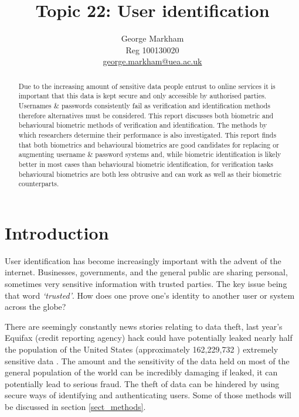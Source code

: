 \documentclass[12pt]{article}
\title{Topic 22: User identification}
\author{George Markham\\Reg 100130020\\\small
\href{mailto:george.markham@uea.ac.uk}{george.markham@uea.ac.uk}}
\begin{document}
	\maketitle
	
    
	\begin{abstract}
	Due to the increasing amount of sensitive data people entrust to online services it is important that this data is kept secure and only accessible by authorised parties. Usernames \& passwords consistently fail as verification and identification methods therefore alternatives must be considered. This report discusses both biometric and behavioural biometric methods of verification and identification. The methods by which researchers determine their performance is also investigated. This report finds that both biometrics and behavioural biometrics are good candidates for replacing or augmenting username \& password systems and, while biometric identification is likely better in most cases than behavioural biometric identification, for verification tasks behavioural biometrics are both less obtrusive and can work as well as their biometric counterparts.
	\end{abstract}
	
	\tableofcontents
	
	\pagestyle{fancy}
    \setlength{\headsep}{1cm}
    
	\section{Introduction}
	User identification has become increasingly important with the advent of the internet. Businesses, governments, and the general public are sharing personal, sometimes very sensitive information with trusted parties. The key issue being that word \emph{`trusted'}. How does one prove one's identity to another user or system across the globe? 
	
	There are seemingly constantly news stories relating to data theft, last year's Equifax (credit reporting agency) hack could have potentially leaked nearly half the population of the United States (approximately 162,229,732 \citep{worldometers_2014}) extremely sensitive data \citep{equifax_cnet}. The amount and the sensitivity of the data held on most of the general population of the world can be incredibly damaging if leaked, it can potentially lead to serious fraud. The theft of data can be hindered by using secure ways of identifying and authenticating users. Some of those methods will be discussed in section \ref{sect_methods}. 
	
\end{document}
